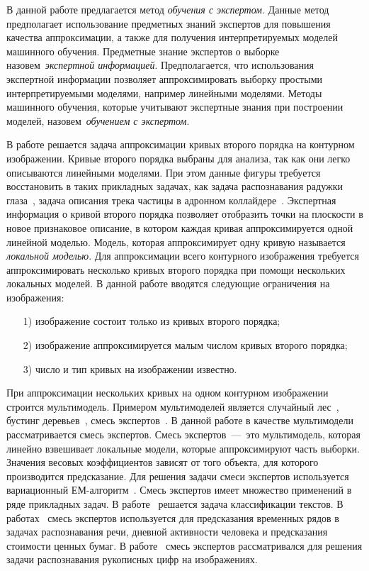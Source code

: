 \documentclass[12pt, twoside]{article}
\numberwithin{equation}{section}
\begin{document}
В данной работе предлагается метод \textit{обучения с экспертом}.
Данные метод предполагает использование предметных знаний экспертов для повышения качества аппроксимации, а также для получения интерпретируемых моделей машинного обучения.
Предметные знание экспертов о выборке назовем~\textit{экспертной информацией}.
Предполагается, что использования экспертной информации позволяет аппроксимировать выборку простыми интерпретируемыми моделями, например линейными моделями. Методы машинного обучения, которые учитывают экспертные знания при построении моделей, назовем~\textit{обучением с экспертом}.

В работе решается задача аппроксимации кривых второго порядка на контурном изображении. Кривые второго порядка выбраны для анализа, так как они легко описываются линейными моделями. При этом данные фигуры требуется восстановить в таких прикладных задачах, как задача распознавания радужки глаза~\cite{Matveev2010, Matveev2014, Bowyer2010}, задача описания трека частицы в адронном коллайдере~\cite{Dalila}. Экспертная информация о кривой второго порядка позволяет отобразить точки на плоскости в новое признаковое описание, в котором каждая кривая аппроксимируется одной линейной моделью. Модель, которая аппроксимирует одну кривую называется \textit{локальной моделью}. Для аппроксимации всего контурного изображения требуется аппроксимировать несколько кривых второго порядка при помощи нескольких локальных моделей. В данной работе вводятся следующие ограничения на изображения:
\begin{enumerate}
	\item[1)] изображение состоит только из кривых второго порядка;
	\item[2)] изображение аппроксимируется малым числом кривых второго порядка;
	\item[3)] число и тип кривых на изображении известно.
\end{enumerate}

При аппроксимации нескольких кривых на одном контурном изображении строится мультимодель. Примером мультимоделей является случайный лес~\cite{Ishwaran2012}, бустинг деревьев~\cite{Tianqi2016}, смесь экспертов~\cite{Yuksel2012}. В данной работе в качестве мультимодели рассматривается смесь экспертов. Смесь экспертов~---~это мультимодель, которая линейно взвешивает локальные модели, которые аппроксимируют часть выборки. Значения весовых коэффициентов зависят от того объекта, для которого производится предсказание. Для решения задачи смеси экспертов используется вариационный ЕМ-алгоритм~\cite{Dempster1977, bishop2006, Peng1996}. Смесь экспертов имеет множество применений в ряде прикладных задач. В работе~\cite{Estabrooks2001} решается задача классификации текстов. В работах~\cite{Cheung1995, Weigend2000, Cao2003, Mossavat2010, Sminchisescu2007, Tuerk2001, Yumlu2003} смесь экспертов используется для предсказания временных рядов в задачах распознавания речи, дневной активности человека и предсказания стоимости ценных бумаг. В работе~\cite{Ebrahimpour2009} смесь экспертов рассматривался для решения задачи распознавания рукописных цифр на изображениях.
\end{document}
